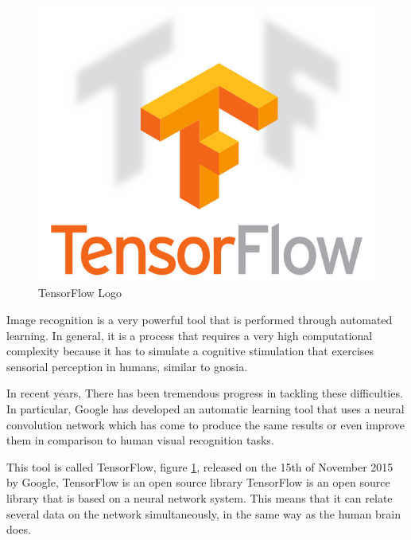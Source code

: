 \begin{figure}[h]
\centering
\includegraphics[scale=0.4]{figures/tensorflow_logo.png}
\caption{TensorFlow Logo}
\label{TensorFlow_Logo}
\end{figure}

Image recognition is a very powerful tool that is performed through automated learning. In general, it is a process that requires a very high computational complexity because it has to simulate a cognitive stimulation that exercises sensorial perception in humans, similar to gnosia.

In recent years, There has been tremendous progress in tackling these difficulties. In particular, Google has developed an automatic learning tool that uses a neural convolution network which has come to produce the same results or even improve them in comparison to human visual recognition tasks.

This tool is called TensorFlow, figure  \ref{TensorFlow_Logo}, released on the 15th of November 2015 by Google, TensorFlow is an open source library TensorFlow is an open source library that is based on a neural network system. This means that it can relate several data on the network simultaneously, in the same way as the human brain does.


